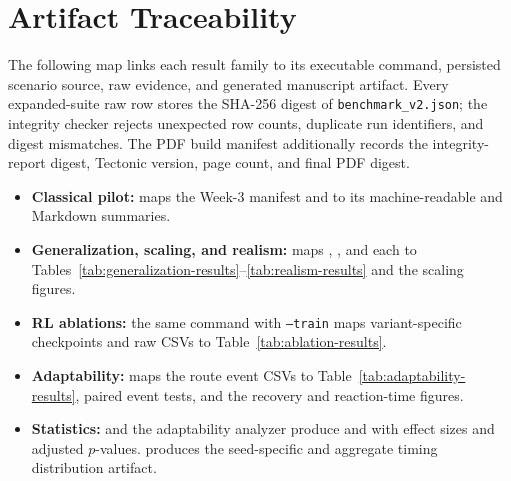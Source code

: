 \appendices
\section{Artifact Traceability}
\label{app:artifact-traceability}

The following map links each result family to its executable command, persisted
scenario source, raw evidence, and generated manuscript artifact.
Every expanded-suite raw row stores the SHA-256 digest of
\texttt{benchmark\_v2.json}; the integrity checker rejects unexpected row
counts, duplicate run identifiers, and digest mismatches. The PDF build
manifest additionally records the integrity-report digest, Tectonic version,
page count, and final PDF digest.

\begin{itemize}
    \item \textbf{Classical pilot:}
     maps the Week-3 manifest and
     to its machine-readable and Markdown
    summaries.
    \item \textbf{Generalization, scaling, and realism:}
     maps
    , , and each
     to
    Tables~\ref{tab:generalization-results}--\ref{tab:realism-results} and the
    scaling figures.
    \item \textbf{RL ablations:} the same command with \texttt{--train} maps
    variant-specific checkpoints and raw CSVs to
    Table~\ref{tab:ablation-results}.
    \item \textbf{Adaptability:}
     maps the route event CSVs to
    Table~\ref{tab:adaptability-results}, paired event tests, and the recovery
    and reaction-time figures.
    \item \textbf{Statistics:}
     and the adaptability analyzer
    produce  and
     with effect sizes and adjusted
    $p$-values.  produces
    the seed-specific and aggregate timing distribution artifact.
\end{itemize}
